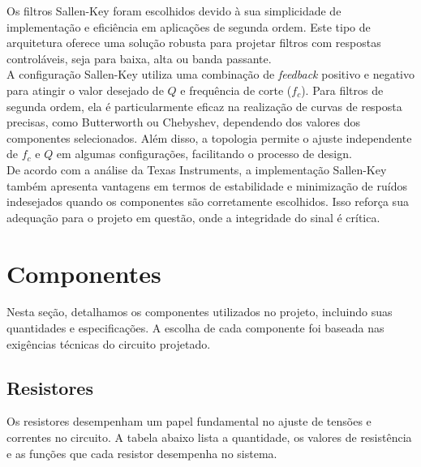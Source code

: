 \documentclass[a4paper, 12pt]{article}
\begin{document}
Os filtros Sallen-Key foram escolhidos devido à sua simplicidade de implementação e eficiência em aplicações de segunda ordem. Este tipo de arquitetura oferece uma solução robusta para projetar filtros com respostas controláveis, seja para baixa, alta ou banda passante.\\

A configuração Sallen-Key utiliza uma combinação de \textit{feedback} positivo e negativo para atingir o valor desejado de $Q$ e frequência de corte ($f_c$). Para filtros de segunda ordem, ela é particularmente eficaz na realização de curvas de resposta precisas, como Butterworth ou Chebyshev, dependendo dos valores dos componentes selecionados. Além disso, a topologia permite o ajuste independente de $f_c$ e $Q$ em algumas configurações, facilitando o processo de design.\\

De acordo com a análise da Texas Instruments, a implementação Sallen-Key também apresenta vantagens em termos de estabilidade e minimização de ruídos indesejados quando os componentes são corretamente escolhidos. Isso reforça sua adequação para o projeto em questão, onde a integridade do sinal é crítica.\\



\section{Componentes}

Nesta seção, detalhamos os componentes utilizados no projeto, incluindo suas quantidades e especificações. A escolha de cada componente foi baseada nas exigências técnicas do circuito projetado.

\subsection{Resistores}

Os resistores desempenham um papel fundamental no ajuste de tensões e correntes no circuito. A tabela abaixo lista a quantidade, os valores de resistência e as funções que cada resistor desempenha no sistema.
\end{document}
